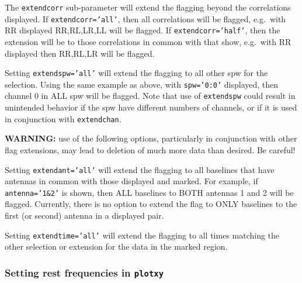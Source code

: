 The {\tt extendcorr} sub-parameter will extend the flagging beyond the
correlations displayed.  If {\tt extendcorr='all'}, then all
correlations will be flagged, e.g.\ with RR displayed RR,RL,LR,LL will 
be flagged.  If {\tt extendcorr='half'}, then the extension will be
to those correlations in common with that show, e.g.\ with RR
displayed then RR,RL,LR will be flagged.

Setting {\tt extendspw='all'} will extend the flagging to all other
spw for the selection.  Using the same example as above, with
{\tt spw='0:0'} displayed, then channel 0 in ALL spw will be flagged.
Note that use of {\tt extendspw} could result in unintended behavior
if the spw have different numbers of channels, or if it is used in
conjunction with {\tt extendchan}.

{\bf WARNING:} use of the following options, particularly in
conjunction with other flag extensions, may lead to deletion of much
more data than desired.  Be careful!

Setting {\tt extendant='all'} will extend the flagging to all
baselines that have antennas in common with those displayed and
marked.  For example, if {\tt antenna='1\&2'} is shown, then ALL
baselines to BOTH antennas 1 and 2 will be flagged.  Currently, there
is no option to extend the flag to ONLY baselines to the first (or 
second) antenna in a displayed pair.

Setting {\tt extendtime='all'} will extend the flagging to all times 
matching the other selection or extension for the data in the marked
region.  

\subsubsection{Setting rest frequencies in {\tt plotxy}}
\label{section:edit.plot.plotxy.restfreq}

